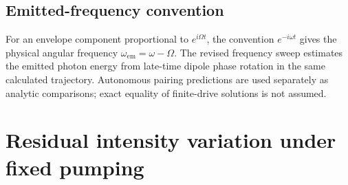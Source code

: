 \documentclass[9pt]{osa-supplemental-document}
\begin{document}
\subsection{Emitted-frequency convention}
For an envelope component proportional to $e^{i\Omega t}$, the convention $e^{-i\omega t}$ gives the physical angular frequency $\omega_{\mathrm{em}}=\omega-\Omega$. The revised frequency sweep estimates the emitted photon energy from late-time dipole phase rotation in the same calculated trajectory. Autonomous pairing predictions are used separately as analytic comparisons; exact equality of finite-drive solutions is not assumed.

\section{Residual intensity variation under fixed pumping}
\label{sec:residual_modulation}
\end{document}
